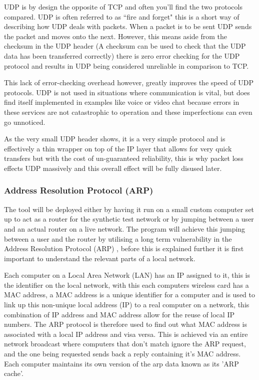 UDP is by design the opposite of TCP and often you'll find the two protocols compared. UDP is often referred to as ``fire and forget" \citep{kempf2011thoughts} this is a short way of describing how UDP deals with packets. When a packet is to be sent UDP sends the packet and moves onto the next. However, this means aside from the checksum in the UDP header (A checksum can be used to check that the UDP data has been transferred correctly) there is zero error checking for the UDP protocol and results in UDP being considered unreliable in comparison to TCP. 

This lack of error-checking overhead however, greatly improves the speed of UDP protocols. UDP is not used in situations where communication is vital, but does find itself implemented in examples like voice or video chat because errors in these services are not catastrophic to operation and these imperfections can even go unnoticed.


As the very small UDP header shows, it is a very simple protocol and is effectively a thin wrapper on top of the IP layer that allows for very quick transfers but with the cost of un-guaranteed reliability, this is why packet loss effects UDP massively and this overall effect will be fully disused later.

\clearpage
\subsubsection{Address Resolution Protocol (ARP)}
The tool will be deployed either by having it run on a small custom computer set up to act as a router for the synthetic test network or by jumping between a user and an actual router on a live network. The program will achieve this jumping between a user and the router by utilising a long term vulnerability in the Address Resolution Protocol (ARP) \citep{arp2001}, before this is explained further it is first important to understand the relevant parts of a local network.

Each computer on a Local Area Network (LAN) has an IP assigned to it, this is the identifier on the local network, with this each computers wireless card has a MAC address, a MAC address is a unique identifier for a computer and is used to link up this non-unique local address (IP) to a real computer on a network, this combination of IP address and MAC address allow for the reuse of local IP numbers. The ARP protocol is therefore used to find out what MAC address is associated with a local IP address and visa versa. This is achieved via an entire network broadcast where computers that don't match ignore the ARP request, and the one being requested sends back a reply containing it's MAC address. Each computer maintains its own version of the arp data known as its 'ARP cache'.


